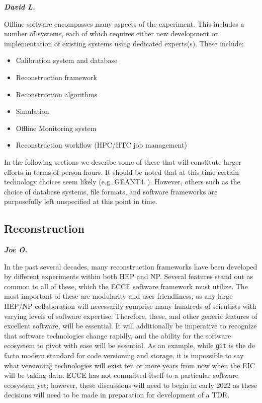 
\textbf{\emph{David L.}}

Offline software encompasses many aspects of the experiment. This includes a number of systems, each of which requires either new development or implementation of existing systems using dedicated experts(s). These include:

\begin{itemize}
    \item Calibration system and database
    \item Reconstruction framework
    \item Reconstruction algorithms
    \item Simulation
    \item Offline Monitoring system
    \item Reconstruction workflow (HPC/HTC job management)
\end{itemize}

In the following sections we describe some of these that will constitute larger efforts in terms of person-hours. It should be noted that at this time certain technology choices seem likely (e.g. GEANT4~\cite{ALLISON2016186}). However, others such as the choice of database systems, file formats, and software frameworks are purposefully left unspecified at this point in time.

\subsection{Reconstruction}\label{subsec:reconstruction}

\textbf{\emph{Joe O.}}

In the past several decades, many reconstruction frameworks have been developed by different experiments within both HEP and NP. Several features stand out as common to all of these, which the ECCE software framework must utilize. The most important of these are modularity and user friendliness, as any large HEP/NP collaboration will necessarily comprise many hundreds of scientists with varying levels of software expertise. Therefore, these, and other generic features of excellent software, will be essential. It will additionally be imperative to recognize that software technologies change rapidly, and the ability for the software ecosystem to pivot with ease will be essential. As an example, while \texttt{git} is the de facto modern standard for code versioning and storage, it is impossible to say what versioning technologies will exist ten or more years from now when the EIC will be taking data. ECCE has not committed itself to a particular software ecosystem yet; however, these discussions will need to begin in early 2022 as these decisions will need to be made in preparation for development of a TDR.

